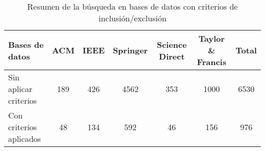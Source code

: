 \begin{table}[H]
\centering
\scriptsize
\setlength{\tabcolsep}{4pt}
\renewcommand{\arraystretch}{1.1}
\begin{tabular}{|l|c|c|c|c|c|c|}
\hline
\textbf{Bases de datos} & \textbf{ACM} & \textbf{IEEE} & \textbf{Springer} & \textbf{Science Direct} & \textbf{Taylor \& Francis} & \textbf{Total} \\
\hline
Sin aplicar criterios & 189 & 426 & 4562 & 353 & 1000 & 6530 \\
\hline
Con criterios aplicados & 48 & 134 & 592 & 46 & 156 & 976 \\
\hline
\end{tabular}
\caption{Resumen de la búsqueda en bases de datos con criterios de inclusión/exclusión}
\label{tab:resumen-busqueda}
\end{table}
